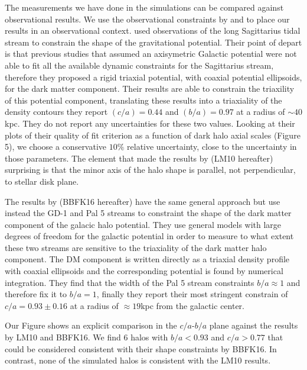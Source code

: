 \documentclass[a4paper,fleqn,usenatbib]{mnras}
\begin{document}
The measurements we have done in the simulations can be compared
against observational results.
We use the observational constraints by \cite{LM10} and \cite{Bovy16}
to place our results in an observational context.
\cite{LM10} used observations of the long Sagittarius tidal stream to
constrain the shape of the gravitational potential.
Their point of depart is that previous studies that assumed an
axisymetric Galactic potential were not able to fit all the available
dynamic constraints for the Sagittarius stream, therefore they
proposed a rigid triaxial potential, with coaxial potential
ellipsoids, for the dark matter component.  
Their results are able to constrain the triaxility of this potential
component, translating these results into a triaxiality of the density
contours they report $(c/a)=0.44$ and $(b/a)=0.97$ at a radius of
$\sim 40$kpc. They do not report any uncertainties for these two
values. 
Looking at their plots of their quality of fit criterion as a function
of dark halo axial scales (Figure 5), we choose a conservative $10\%$
relative uncertainty, close to the uncertainty in those parameters.
The element that made the results by \cite{LM10} (LM10 hereafter) surprising is that
the minor axis of the halo shape is parallel, not perpendicular, to
stellar disk plane. 

The results by \cite{Bovy16} (BBFK16 hereafter) have the same general approach but use
instead the GD-1 \citep{2006ApJ...641L..37G} and Pal 5 \citep{2009AJ....137.3378O}
streams to constraint the shape of the dark matter component of the
galacic halo potential.
They use general models with large degrees of freedom for the galactic
potential in order to measure to what extent these two streams are sensitive
to the triaxiality of the dark matter halo component.
The DM component is written directly as a triaxial density profile
with coaxial ellipsoids and the corresponding potential is found by
numerical integration.
They find that the width of the Pal 5 stream constraints $b/a\approx
1$ and therefore fix it to $b/a=1$, finally they report their most stringent
constrain of $c/a=0.93\pm0.16$ at a radius of $\approx 19$kpc from the
galactic center.

Our Figure \label{fig:observations} shows an explicit comparison in
the $c/a$-$b/a$ plane against the results by LM10 and BBFK16. 
We find $6$ halos with $b/a<0.93$ and $c/a>0.77$ that could be
considered consistent with their shape constraints 
by BBFK16.
In contrast, none of the simulated halos is consistent with the LM10
results. 
\end{document}
